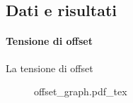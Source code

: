 \subsection{Dati e risultati}

\paragraph{Tensione di offset}

La tensione di offset

\begin{figure}[h]
    \def\svgwidth{0.5\textwidth}
    {offset_graph.pdf_tex}
\end{figure}
